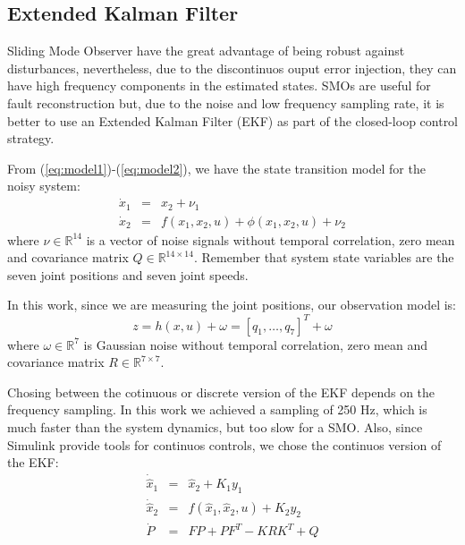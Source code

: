 \documentclass[a4paper, 10pt]{article}
\begin{document}
\subsection{Extended Kalman Filter}
Sliding Mode Observer have the great advantage of being robust against disturbances, nevertheless, due to the discontinuos ouput error injection, they can have high frequency components in the estimated states. SMOs are useful for fault reconstruction but, due to the noise and low frequency sampling rate, it is better to use an Extended Kalman Filter (EKF) as part of the closed-loop control strategy.

From (\ref{eq:model1})-(\ref{eq:model2}), we have the state transition model for the noisy system:
\begin{eqnarray}
    \dot{x}_1 &=& x_2 + \nu_1\label{eq:noisymodel1}\\
    \dot{x}_2 &=& f(x_1, x_2, u) + \phi(x_1, x_2, u) + \nu_2\label{eq:noisymodel2}
\end{eqnarray}
where $\nu \in\mathbb{R}^14$ is a vector of noise signals without temporal correlation, zero mean and covariance matrix $Q\in\mathbb{R}^{14\times 14}$. Remember that system state variables are the seven joint positions and seven joint speeds.

In this work, since we are measuring the joint positions, our observation model is:
\begin{equation}
  z = h(x,u) + \omega = [q_1,\dots,q_7]^T + \omega
  \label{eq:obsmodel}
\end{equation}
where $\omega\in\mathbb{R}^7$ is Gaussian noise without temporal correlation, zero mean and covariance matrix $R\in\mathbb{R}^{7\times 7}$.

Chosing between the cotinuous or discrete version of the EKF depends on the frequency sampling. In this work we achieved a sampling of 250 Hz, which is much faster than the system dynamics, but too slow for a SMO. Also, since Simulink provide tools for continuos controls, we chose the continuos version of the EKF:
\begin{eqnarray}
  \dot{\hat{x}}_1 &=& \hat{x}_2 + K_1 y_1 \label{eq:ekf1}\\
  \dot{\hat{x}}_2 &=& f(\hat{x}_1, \hat{x}_2, u) + K_2 y_2\label{eq:ekf2}\\
  \dot{P} &=& FP + PF^T - KRK^T + Q\label{eq:ekf3}
\end{eqnarray}
\end{document}

